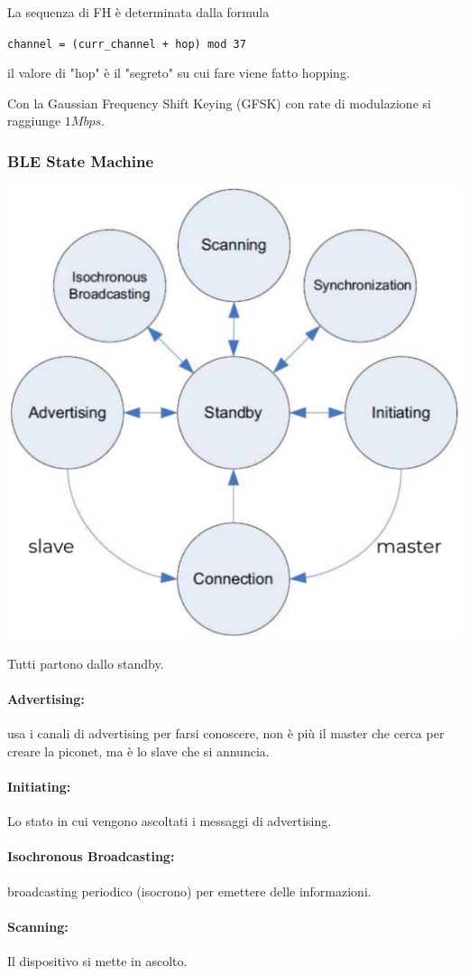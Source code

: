 La sequenza di FH è determinata dalla formula
\begin{center}
	\texttt{channel = (curr\_channel + hop) mod 37}
\end{center}
il valore di "hop" è il "segreto" su cui fare viene fatto hopping.  

Con la Gaussian Frequency Shift Keying (GFSK) con rate di modulazione si raggiunge $1Mbps$.

\subsubsection{BLE State Machine}
\begin{center}
	\includegraphics[width=0.6\linewidth]{img/wpan/blestate}
\end{center}
Tutti partono dallo standby.

\paragraph{Advertising:} usa i canali di advertising per farsi conoscere, non è più il master che cerca per creare la piconet, ma è lo slave che si annuncia. 

\paragraph{Initiating:} Lo stato in cui vengono ascoltati i messaggi di advertising.

\paragraph{Isochronous Broadcasting:} broadcasting periodico (isocrono) per emettere delle informazioni.

\paragraph{Scanning:} Il dispositivo si mette in ascolto.

